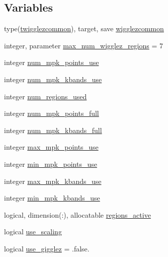 \subsection*{Variables}
\begin{DoxyCompactItemize}
\item 
type(\mbox{\hyperlink{structwigglez_1_1twigglezcommon}{twigglezcommon}}), target, save \mbox{\hyperlink{namespacewigglez_a1a7784e6e8553a1ae1cf8a3eb8276341}{wigglezcommon}}
\item 
integer, parameter \mbox{\hyperlink{namespacewigglez_a8d5cc17b3425207c6850325bc82a93a5}{max\+\_\+num\+\_\+wigglez\+\_\+regions}} = 7
\item 
integer \mbox{\hyperlink{namespacewigglez_af0a2aa38606b250dcb980ccb92fc11ca}{num\+\_\+mpk\+\_\+points\+\_\+use}}
\item 
integer \mbox{\hyperlink{namespacewigglez_ac9ec4f774e0116431ec283376d04fa35}{num\+\_\+mpk\+\_\+kbands\+\_\+use}}
\item 
integer \mbox{\hyperlink{namespacewigglez_a31d03f56c463d2ce29e24a2d5b1ac7b1}{num\+\_\+regions\+\_\+used}}
\item 
integer \mbox{\hyperlink{namespacewigglez_a958f6e7ea41ba27bf96a9d39f3a9b52b}{num\+\_\+mpk\+\_\+points\+\_\+full}}
\item 
integer \mbox{\hyperlink{namespacewigglez_aa43acb845d2f5a4e86a07485f5d8f0f3}{num\+\_\+mpk\+\_\+kbands\+\_\+full}}
\item 
integer \mbox{\hyperlink{namespacewigglez_a5ef8736870101bebb0d86b2c5c733d8d}{max\+\_\+mpk\+\_\+points\+\_\+use}}
\item 
integer \mbox{\hyperlink{namespacewigglez_aaa7aa3063584475463df9bd85fceeffd}{min\+\_\+mpk\+\_\+points\+\_\+use}}
\item 
integer \mbox{\hyperlink{namespacewigglez_a7c1d18206f96a33e914468b317457ba1}{max\+\_\+mpk\+\_\+kbands\+\_\+use}}
\item 
integer \mbox{\hyperlink{namespacewigglez_a1fba40082b46206664553f88666cb6aa}{min\+\_\+mpk\+\_\+kbands\+\_\+use}}
\item 
logical, dimension(\+:), allocatable \mbox{\hyperlink{namespacewigglez_a4bf753383300f61cecdd5c8cd8fdaae3}{regions\+\_\+active}}
\item 
logical \mbox{\hyperlink{namespacewigglez_ae38c8e45630d25b0d97109dd26bc3cd4}{use\+\_\+scaling}}
\item 
logical \mbox{\hyperlink{namespacewigglez_a852cec3f5b6f650f8cfd9e8bdee9fc33}{use\+\_\+gigglez}} = .false.
\item 

\end{DoxyCompactItemize}
